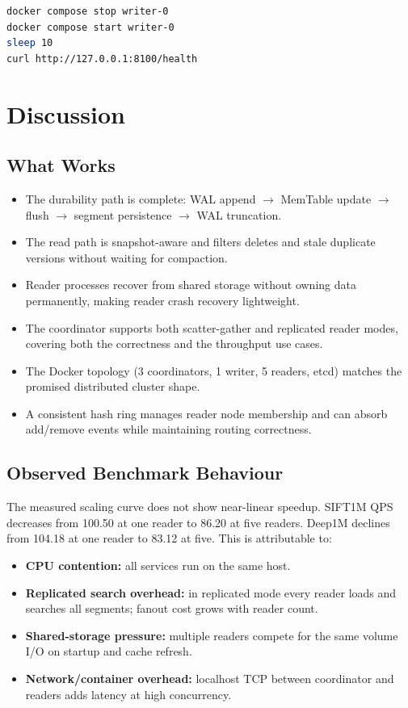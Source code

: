 \documentclass[11pt,a4paper]{article}
\begin{document}
\begin{lstlisting}[language=bash, caption={Writer restart check.}]
docker compose stop writer-0
docker compose start writer-0
sleep 10
curl http://127.0.0.1:8100/health
\end{lstlisting}

\section{Discussion}

\subsection{What Works}

\begin{itemize}[noitemsep,topsep=4pt]
  \item The durability path is complete: WAL append $\to$ MemTable update
    $\to$ flush $\to$ segment persistence $\to$ WAL truncation.
  \item The read path is snapshot-aware and filters deletes and stale
    duplicate versions without waiting for compaction.
  \item Reader processes recover from shared storage without owning data
    permanently, making reader crash recovery lightweight.
  \item The coordinator supports both scatter-gather and replicated reader
    modes, covering both the correctness and the throughput use cases.
  \item The Docker topology (3 coordinators, 1 writer, 5 readers, etcd)
    matches the promised distributed cluster shape.
  \item A consistent hash ring manages reader node membership and can absorb
    add/remove events while maintaining routing correctness.
\end{itemize}

\subsection{Observed Benchmark Behaviour}

The measured scaling curve does not show near-linear speedup. SIFT1M QPS
decreases from 100.50 at one reader to 86.20 at five readers. Deep1M declines
from 104.18 at one reader to 83.12 at five. This is attributable to:

\begin{itemize}[noitemsep,topsep=4pt]
  \item \textbf{CPU contention:} all services run on the same host.
  \item \textbf{Replicated search overhead:} in replicated mode every reader
    loads and searches all segments; fanout cost grows with reader count.
  \item \textbf{Shared-storage pressure:} multiple readers compete for the
    same volume I/O on startup and cache refresh.
  \item \textbf{Network/container overhead:} localhost TCP between
    coordinator and readers adds latency at high concurrency.
\end{itemize}
\end{document}
